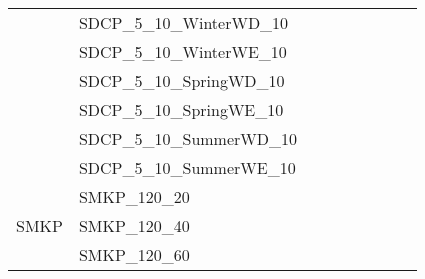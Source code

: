 \begin{table}[]
{\begin{tabular}{|c|l|ll|ll|l|l|l|}
			& SDCP\_5\_10\_WinterWD\_10     &                                 &                                &                                  &                                 &                                    &                            &                            \\
			& SDCP\_5\_10\_WinterWE\_10     &                                 &                                &                                  &                                 &                                    &                            &                            \\
			& SDCP\_5\_10\_SpringWD\_10     &                                 &                                &                                  &                                 &                                    &                            &                            \\
			& SDCP\_5\_10\_SpringWE\_10     &                                 &                                &                                  &                                 &                                    &                            &                            \\
			& SDCP\_5\_10\_SummerWD\_10     &                                 &                                &                                  &                                 &                                    &                            &                            \\
			& SDCP\_5\_10\_SummerWE\_10     &                                 &                                &                                  &                                 &                                    &                            &                            \\ \hline
			\multirow{5}{*}{SMKP}    & SMKP\_120\_20                 &                                 &                                &                                  &                                 &                                    &                            &                            \\
			& SMKP\_120\_40                 &                                 &                                &                                  &                                 &                                    &                            &                            \\
			& SMKP\_120\_60                 &                                 &                                &                                  &                                 &                                    &                            &                            \\

\end{tabular}}
\end{table}
